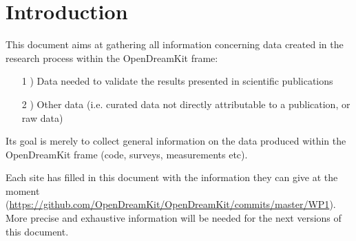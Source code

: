 \documentclass{../../Proposal/LaTeX-proposal/deliverablereport}
\author{Benoît Pilorget}
\begin{document}
\maketitle
\newpage

\tableofcontents\newpage

\section{Introduction}

This document aims at gathering all information concerning data created in the research process within the OpenDreamKit frame:

\begin{enumerate}
\item[1]) Data needed to validate the results presented in scientific publications
\item[2]) Other data (i.e. curated data not directly attributable to a publication, or raw data)
\end{enumerate}
Its goal is merely to collect general information on the data produced within the OpenDreamKit frame (code, surveys, measurements etc). 

Each site has filled in this document with the information they can give at the moment (\href{https://github.com/OpenDreamKit/OpenDreamKit/commits/master/WP1}{https://github.com/OpenDreamKit/OpenDreamKit/commits/master/WP1}). More precise and exhaustive information will be needed for the next versions of this document.
\end{document}
